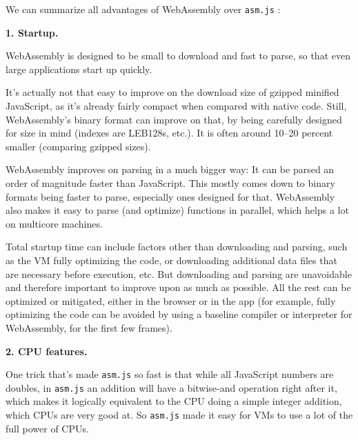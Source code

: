 We can summarize all advantages of WebAssembly over \texttt{asm.js} \cite{wasm_asm}:

\textbf{1. Startup.}

WebAssembly is designed to be small to download and fast to parse, so that even large applications start up quickly.

It’s actually not that easy to improve on the download size of gzipped minified JavaScript, as it’s already fairly compact when compared with native code. Still, WebAssembly’s binary format can improve on that, by being carefully designed for size in mind (indexes are LEB128s, etc.). It is often around 10–20 percent smaller (comparing gzipped sizes).

WebAssembly improves on parsing in a much bigger way: It can be parsed an order of magnitude faster than JavaScript. This mostly comes down to binary formats being faster to parse, especially ones designed for that. WebAssembly also makes it easy to parse (and optimize) functions in parallel, which helps a lot on multicore machines.

Total startup time can include factors other than downloading and parsing, such as the VM fully optimizing the code, or downloading additional data files that are necessary before execution, etc. But downloading and parsing are unavoidable and therefore important to improve upon as much as possible. All the rest can be optimized or mitigated, either in the browser or in the app (for example, fully optimizing the code can be avoided by using a baseline compiler or interpreter for WebAssembly, for the first few frames).

\textbf{2. CPU features.}

One trick that’s made \texttt{asm.js} so fast is that while all JavaScript numbers are doubles, in \texttt{asm.js} an addition will have a bitwise-and operation right after it, which makes it logically equivalent to the CPU doing a simple integer addition, which CPUs are very good at. So \texttt{asm.js} made it easy for VMs to use a lot of the full power of CPUs.

